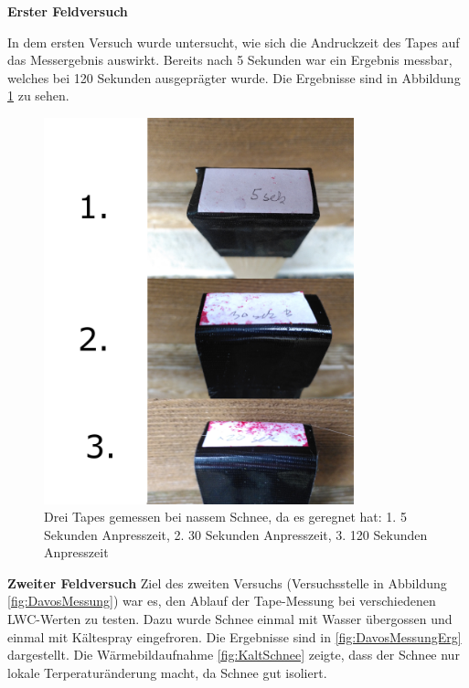


\textbf{Erster Feldversuch}
\label{ersterFeldVer}

In dem ersten Versuch wurde untersucht, wie sich die Andruckzeit des Tapes auf das Messergebnis auswirkt. Bereits nach 5 Sekunden war ein Ergebnis messbar, welches bei 120 Sekunden ausgeprägter wurde. Die Ergebnisse sind in Abbildung \ref{fig:ZeitDruck} zu sehen.

\begin{figure}[H]
    \centering
    \includegraphics[width=0.8\textwidth]{Bilder/ZeitAbha.png}
    \caption{Drei Tapes gemessen bei nassem Schnee, da es geregnet hat: 1. 5 Sekunden Anpresszeit, 2. 30 Sekunden Anpresszeit, 3. 120 Sekunden Anpresszeit} 
    \label{fig:ZeitDruck}
\end{figure}

\newpage
\textbf{Zweiter Feldversuch}
\label{zweitFeldVer}
Ziel des zweiten Versuchs (Versuchsstelle in Abbildung \ref{fig:DavosMessung}) war es, den Ablauf der Tape-Messung bei verschiedenen LWC-Werten zu testen. Dazu wurde Schnee einmal mit Wasser übergossen und einmal mit Kältespray eingefroren. Die Ergebnisse sind in \ref{fig:DavosMessungErg} dargestellt. Die Wärmebildaufnahme \ref{fig:KaltSchnee} zeigte, dass der Schnee nur lokale Terperaturänderung macht, da Schnee gut isoliert. 

